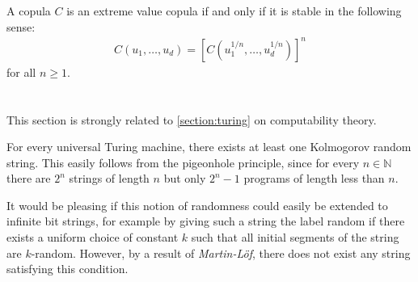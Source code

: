     \begin{property}
        A copula $C$ is an extreme value copula if and only if it is stable in the following sense:
        \begin{gather}
            C(u_1,\ldots,u_d) = \left[C(u_1^{1/n},\ldots,u_d^{1/n})\right]^n
        \end{gather}
        for all $n\geq1$.
    \end{property}

\section{}

    This section is strongly related to \cref{section:turing} on computability theory.


    \begin{property}
        For every universal Turing machine, there exists at least one Kolmogorov random string. This easily follows from the pigeonhole principle, since for every $n\in\mathbb{N}$ there are $2^n$ strings of length $n$ but only $2^n-1$ programs of length less than $n$.
    \end{property}

    It would be pleasing if this notion of randomness could easily be extended to infinite bit strings, for example by giving such a string the label random if there exists a uniform choice of constant $k$ such that all initial segments of the string are $k$-random. However, by a result of \textit{Martin-L\"of}, there does not exist any string satisfying this condition.


